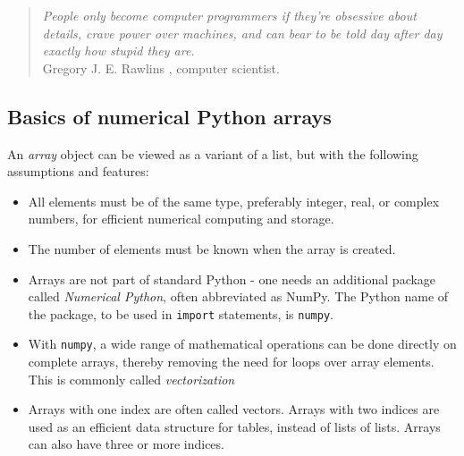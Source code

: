 \documentclass[graybox,sectrefs,envcountresetchap,open=right,final]{svmonodo}
\begin{document}
\begin{quote}
\emph{People only become computer programmers if they're
obsessive about details, crave power over machines, and can bear
to be told day after day exactly how
stupid they are.} \\
Gregory J. E. Rawlins \cite{Rawlins_1998}, computer scientist.
\end{quote}


\subsection{Basics of numerical Python arrays}
\label{sec:plot:array:basics}

  
 

An \emph{array} object can be viewed as a variant of a list, but with the
following assumptions and features:

\begin{itemize}
  \item All elements must be of the same type, preferably integer, real, or complex numbers, for efficient numerical computing and storage.

  \item The number of elements must be known when the array is created.

  \item Arrays are not part of standard Python - one needs an additional package called \emph{Numerical Python}, often abbreviated as NumPy. The Python name of the package, to be used in \texttt{import} statements, is \texttt{numpy}.

  \item With \texttt{numpy}, a wide range of mathematical operations can be done directly on complete arrays, thereby removing the need for loops over array elements. This is commonly called \emph{vectorization} %

  \item Arrays with one index are often called vectors. Arrays with two indices are used as an efficient data structure for tables, instead of lists of lists. Arrays can also have three or more indices.
\end{itemize}

\noindent
\end{document}
